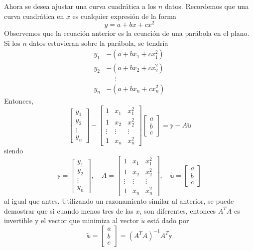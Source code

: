 Ahora se desea ajustar una curva cuadrática a los $n$ datos. Recordemos que una curva cuadrática en $x$ es cualquier expresión de la forma
$$y = a + bx + cx^2$$
Observemos que la ecuación anterior es la ecuación de una parábola en el plano. Si los $n$ datos estuvieran sobre la parábola, se tendría
\begin{align*}
    y_1 & - \left( a + bx_1 + cx_1^2 \right) \\
    y_2 & - \left( a + bx_2 + cx_2^2 \right) \\
    & \phantom{-} \vdots \\
    y_n & - \left( a + bx_n + cx_n^2 \right)
\end{align*}
Entonces,
$$\begin{bmatrix}
    y_1 \\
    y_2 \\
    \vdots \\
    y_n
\end{bmatrix} - \begin{bmatrix}
    1 & x_1 & x_1^2 \\
    1 & x_2 & x_2^2 \\
    \vdots & \vdots & \vdots \\
    1 & x_n & x_n^2
\end{bmatrix} \begin{bmatrix}
    a \\
    b \\
    c
\end{bmatrix} = \mathbb{y} - A \tilde{\mathbb{u}}$$
siendo
$$\mathbb{y} = \begin{bmatrix}
    y_1 \\
    y_2 \\
    \vdots \\
    y_n
\end{bmatrix}, \quad A = \begin{bmatrix}
    1 & x_1 & x_1^2 \\
    1 & x_2 & x_2^2 \\
    \vdots & \vdots & \vdots \\
    1 & x_n & x_n^2
\end{bmatrix}, \quad \tilde{\mathbb{u}} = \begin{bmatrix}
    a \\
    b \\
    c
\end{bmatrix}$$
al igual que antes. Utilizando un razonamiento similar al anterior, se puede demostrar que si cuando menos tres de las $x_i$ son diferentes, entonces $A^TA$ es invertible y el vector que minimiza al vector $\tilde{u}$ está dado por
$$\tilde{\mathbb{u}} = \begin{bmatrix}
    a \\
    b \\
    c
\end{bmatrix} = \left( A^T A \right)^{-1} A^T \mathbb{y}$$

